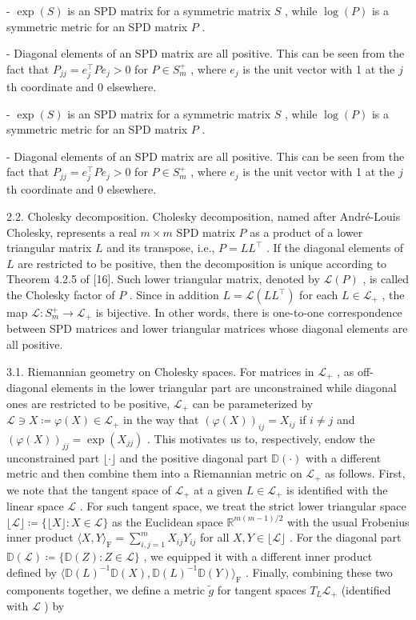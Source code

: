\documentclass[11pt]{article}
\begin{document}
-  $\exp(S)$  is an SPD matrix for a symmetric matrix  $S$ , while  $\log(P)$  is a symmetric metric for an SPD matrix  $P$ .

- Diagonal elements of an SPD matrix are all positive. This can be seen from the fact that  $P_{jj} = e_j^\top Pe_j > 0$  for  $P \in S_m^+$ , where  $e_j$  is the unit vector with 1 at the  $j$ th coordinate and 0 elsewhere.

-  $\exp(S)$  is an SPD matrix for a symmetric matrix  $S$ , while  $\log(P)$  is a symmetric metric for an SPD matrix  $P$ .

- Diagonal elements of an SPD matrix are all positive. This can be seen from the fact that  $P_{jj} = e_j^\top Pe_j > 0$  for  $P \in S_m^+$ , where  $e_j$  is the unit vector with 1 at the  $j$ th coordinate and 0 elsewhere.

2.2. Cholesky decomposition. Cholesky decomposition, named after André-Louis Cholesky, represents a real  $m \times m$  SPD matrix  $P$  as a product of a lower triangular matrix  $L$  and its transpose, i.e.,  $P = LL^{\top}$ . If the diagonal elements of  $L$  are restricted to be positive, then the decomposition is unique according to Theorem 4.2.5 of [16]. Such lower triangular matrix, denoted by  $\mathcal{L}(P)$ , is called the Cholesky factor of  $P$ . Since in addition  $L = \mathcal{L}(LL^{\top})$  for each  $L \in \mathcal{L}_{+}$ , the map  $\mathcal{L}: S_{m}^{+} \to \mathcal{L}_{+}$  is bijective. In other words, there is one-to-one correspondence between SPD matrices and lower triangular matrices whose diagonal elements are all positive.

3.1. Riemannian geometry on Cholesky spaces. For matrices in  $\mathcal{L}_{+}$ , as off-diagonal elements in the lower triangular part are unconstrained while diagonal ones are restricted to be positive,  $\mathcal{L}_{+}$  can be parameterized by  $\mathcal{L} \ni X \coloneqq \varphi(X) \in \mathcal{L}_{+}$  in the way that  $(\varphi(X))_{ij} = X_{ij}$  if  $i \neq j$  and  $(\varphi(X))_{jj} = \exp(X_{jj})$ . This motivates us to, respectively, endow the unconstrained part  $\lfloor \cdot \rfloor$  and the positive diagonal part  $\mathbb{D}(\cdot)$  with a different metric and then combine them into a Riemannian metric on  $\mathcal{L}_{+}$  as follows. First, we note that the tangent space of  $\mathcal{L}_{+}$  at a given  $L \in \mathcal{L}_{+}$  is identified with the linear space  $\mathcal{L}$ . For such tangent space, we treat the strict lower triangular space  $\lfloor \mathcal{L} \rfloor \coloneqq \{\lfloor X \rfloor : X \in \mathcal{L}\}$  as the Euclidean space  $\mathbb{R}^{m(m-1)/2}$  with the usual Frobenius inner product  $\langle X, Y \rangle_{\mathrm{F}} = \sum_{i,j=1}^{m} X_{ij} Y_{ij}$  for all  $X, Y \in \lfloor \mathcal{L} \rfloor$ . For the diagonal part  $\mathbb{D}(\mathcal{L}) \coloneqq \{\mathbb{D}(Z) : Z \in \mathcal{L}\}$ , we equipped it with a different inner product defined by  $\langle \mathbb{D}(L)^{-1} \mathbb{D}(X), \mathbb{D}(L)^{-1} \mathbb{D}(Y) \rangle_{\mathrm{F}}$ . Finally, combining these two components together, we define a metric  $\tilde{g}$  for tangent spaces  $T_L \mathcal{L}_{+}$  (identified with  $\mathcal{L}$ ) by
\end{document}
